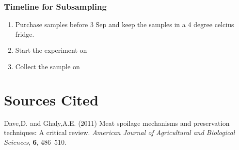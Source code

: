 \documentclass[]{article}
\providecommand{\tightlist}{%
  \setlength{\itemsep}{0pt}\setlength{\parskip}{0pt}}
\begin{document}
\hypertarget{timeline-for-subsampling}{%
\subsubsection{Timeline for
Subsampling}\label{timeline-for-subsampling}}

\begin{enumerate}
\def\labelenumi{\arabic{enumi}.}
\tightlist
\item
  Purchase samples before 3 Sep and keep the samples in a 4 degree
  celcius fridge.
\item
  Start the experiment on
\item
  Collect the sample on
\end{enumerate}

\hypertarget{sources-cited}{%
\section*{Sources Cited}\label{sources-cited}}

\hypertarget{refs}{}
\leavevmode\hypertarget{ref-dave2011meat}{}%
Dave,D. and Ghaly,A.E. (2011) Meat spoilage mechanisms and preservation
techniques: A critical review. \emph{American Journal of Agricultural
and Biological Sciences}, \textbf{6}, 486--510.
\end{document}

